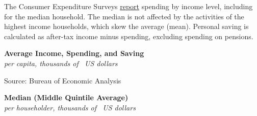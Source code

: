 \documentclass{report}
\makeatletter
\newcommand{\tbllink}[1]{\href{https://raw.githubusercontent.com/bdecon/US-chartbook/master/chartbook/data/#1}{\faTable}}
\newcommand*\short[1]{\expandafter\@gobbletwo\number\numexpr#1\relax}
\newcommand{\absnode}[3]{\node[below right, align=left] at (axis cs: #1,#2) {#3};}
\newcommand{\shdateaxisticks}{
		date coordinates in=x, axis line style={draw=none},
		xmax={2024-01-31},
		max space between ticks=40,	    
		xtick={{1990-01-01}, {1995-01-01}, {2000-01-01}, 
			{2005-01-01}, {2010-01-01}, {2015-01-01}, {2020-01-01}},
		minor xtick={},
		enlarge y limits={0.06}, enlarge x limits={0.01},
		xticklabel style={align=center, yshift=-2pt}, tick label style={inner sep=0pt},
		}
\newcommand{\bbar}[2]{extra #1 ticks = {{#2}}, extra #1 tick labels = ,
		extra #1 tick style = {grid=major, grid style={thick, black!25}},}
\newcommand{\stdline}[4]{\addplot[very thick, no markers, color=#1] 
		table [x=#2, y=#3, col sep=comma] {#4};	}
\newcommand{\rbars}{
		\fill[color=black!10] (axis cs:{1990-07-01},\pgfkeysvalueof{/pgfplots/ymin})
			rectangle (axis cs:{1991-03-01}, \pgfkeysvalueof{/pgfplots/ymax});
		\fill[color=black!10] (axis cs:{2007-12-01},\pgfkeysvalueof{/pgfplots/ymin})
			rectangle (axis cs:{2009-07-01}, \pgfkeysvalueof{/pgfplots/ymax});
		\fill[color=black!10] (axis cs:{2001-03-01},\pgfkeysvalueof{/pgfplots/ymin})
			rectangle (axis cs:{2001-11-01}, \pgfkeysvalueof{/pgfplots/ymax});
		\fill[color=black!10] (axis cs:{2020-02-01},\pgfkeysvalueof{/pgfplots/ymin})
			rectangle (axis cs:{2020-05-01}, \pgfkeysvalueof{/pgfplots/ymax});}
\makeatother
\begin{document}
{\begin{minipage}{1.0\textwidth}


The Consumer Expenditure Surveys \href{https://www.bls.gov/cex/tables.htm}{report} spending by income level, including for the median household. The median is not affected by the activities of the highest income households, which skew the average (mean). Personal saving is calculated as after-tax income minus spending, excluding spending on pensions.


\end{minipage}
\vspace{1mm}

\begin{minipage}{0.425\textwidth}
\normalsize \textbf{Average Income, Spending, and Saving}\\
\footnotesize{\textit{per capita, thousands of \unskip \ US dollars}}
\vspace{5.5cm}

\hspace{2mm} 

\footnotesize{Source: Bureau of Economic Analysis} \hfill \tbllink{inc_out_save.csv}
\end{minipage} \hspace{5mm}
\begin{minipage}{0.43\textwidth}
\normalsize \textbf{Median (Middle Quintile Average)}\\
\footnotesize{\textit{per householder, thousands of \unskip \ US dollars}}
\vspace{5.5cm}


\end{minipage}}
\end{document}
